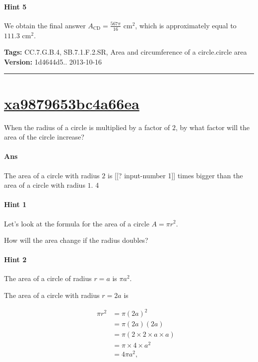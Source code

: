 \documentclass[twocolumn,10pt]{article}
\begin{document}
\paragraph{Hint 5}We obtain the final answer $A_{\text{CD}}=\frac{567\pi}{16}\text{ cm}^2$, which is approximately equal to $111.3\text{ cm}^2$.



\medskip
\noindent
\textbf{Tags:} {\footnotesize CC.7.G.B.4, SB.7.1.F.2.SR, Area and circumference of a circle.circle area}\\
\textbf{Version:} 1d4644d5.. 2013-10-16
\smallskip\hrule





\section{\href{https://www.khanacademy.org/devadmin/content/items/xa9879653bc4a66ea}{xa9879653bc4a66ea}}

\noindent
When the radius of a circle is multiplied by a factor of $2$, by what factor will the area of the circle increase?

\paragraph{Ans} The area of a circle with radius $2$ is [[? input-number 1]] times bigger than the area of a circle with radius $1$.  4

\paragraph{Hint 1}Let's look at the formula for the area of a circle $A=\pi r^2$. 

How will the area change if the radius doubles?

\paragraph{Hint 2}The area of a circle of radius $r=a$ is $\pi a^2$.

The area of a circle with radius $r=2a$ is 

\begin{align*}
\qquad  \pi r^2 & =\pi (2a)^2  \\
  & =\pi(2a)(2a) \\
  &=\pi(2 \times 2 \times a \times a)  \\
   &= \pi \times 4 \times a^2 \\
   &= 4\pi a^2,
\end{align*} 
\end{document}
